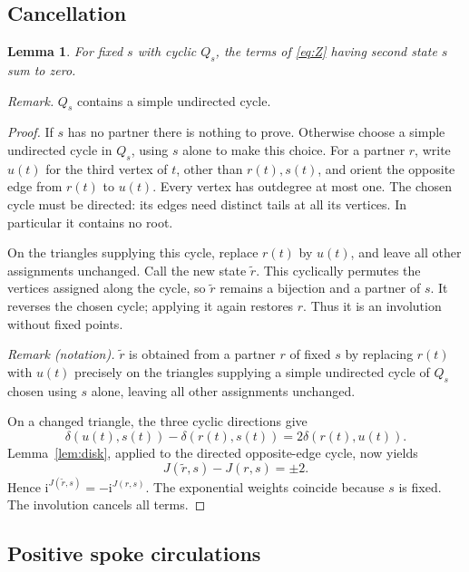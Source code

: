 \documentclass[11pt]{article}
\newtheorem{lemma}[theorem]{Lemma}
\theoremstyle{remark}
\newcommand{\ii}{\mathrm i}
\numberwithin{equation}{section}
\begin{document}
\subsection{Cancellation}

\begin{lemma}\label{lem:cancel}
For fixed \(s\) with cyclic \(Q_s\), the terms of
\eqref{eq:Z} having second state \(s\) sum to zero.
\end{lemma}

\noindent\textit{Remark.} $Q_s$ contains a simple undirected cycle.


\begin{proof}
If \(s\) has no partner there is nothing to prove.
Otherwise choose a simple undirected cycle in \(Q_s\),
using \(s\) alone to make this choice.
For a partner \(r\), write \(u(t)\) for the third vertex
of \(t\), other than \(r(t),s(t)\), and orient the
opposite edge from \(r(t)\) to \(u(t)\). Every vertex
has outdegree at most one. The chosen cycle must be
directed: its edges need distinct tails at all its
vertices. In particular it contains no root.

On the triangles supplying this cycle, replace \(r(t)\)
by \(u(t)\), and leave all other assignments unchanged.
Call the new state \(\widetilde r\). This cyclically
permutes the vertices assigned along the cycle, so
\(\widetilde r\) remains a bijection and a partner of \(s\).
It reverses the chosen cycle; applying it again restores
\(r\). Thus it is an involution without fixed points.

\noindent\textit{Remark (notation).} $\widetilde r$ is obtained from a partner $r$ of fixed $s$ by replacing $r(t)$ with $u(t)$ precisely on the triangles supplying a simple undirected cycle of $Q_s$ chosen using $s$ alone, leaving all other assignments unchanged.


On a changed triangle, the three cyclic directions give
\[
 \delta(u(t),s(t))-\delta(r(t),s(t))
      =2\delta(r(t),u(t)).
\]
Lemma~\ref{lem:disk}, applied to the directed opposite-edge
cycle, now yields
\[
 J(\widetilde r,s)-J(r,s)=\pm2.
\]
Hence \(\ii^{J(\widetilde r,s)}=-\ii^{J(r,s)}\).
The exponential weights coincide because \(s\) is fixed.
The involution cancels all terms.
\end{proof}

\subsection{Positive spoke circulations}
\end{document}
